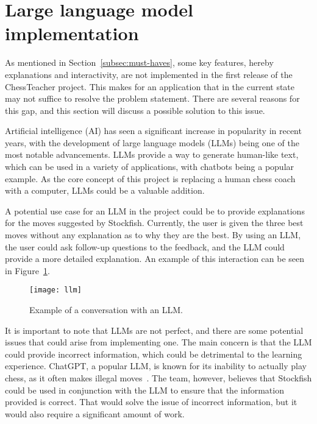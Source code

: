 \section{Large language model implementation}\label{sec:large-language-model-implementation}

As mentioned in Section~\ref{subsec:must-haves}, some key features, hereby explanations and interactivity, are not
implemented in the first release of the ChessTeacher project.
This makes for an application that in the current state may not suffice to resolve the problem statement.
There are several reasons for this gap, and this section will discuss a possible solution to this issue.

Artificial intelligence (AI) has seen a significant increase in popularity in recent years, with the development of
large language models (LLMs) being one of the most notable advancements.
LLMs provide a way to generate human-like text, which can be used in a variety of applications, with chatbots being a
popular example.
As the core concept of this project is replacing a human chess coach with a computer, LLMs could be a valuable addition.

A potential use case for an LLM in the project could be to provide explanations for the moves suggested by Stockfish.
Currently, the user is given the three best moves without any explanation as to why they are the best.
By using an LLM, the user could ask follow-up questions to the feedback, and the LLM could provide a more detailed
explanation.
An example of this interaction can be seen in Figure~\ref{fig:llm}.

\begin{figure}[H]
    \centering
    \texttt{[image: llm]}
    \caption{Example of a conversation with an LLM.}\label{fig:llm}
\end{figure}

It is important to note that LLMs are not perfect, and there are some potential issues that could arise from
implementing one.
The main concern is that the LLM could provide incorrect information, which could be detrimental to the learning
experience.
ChatGPT, a popular LLM, is known for its inability to actually play chess, as it often makes illegal
moves~\cite{llm-chess}.
The team, however, believes that Stockfish could be used in conjunction with the LLM to ensure that the information
provided is correct.
That would solve the issue of incorrect information, but it would also require a significant amount of work.

